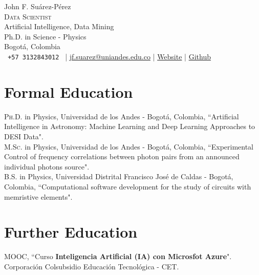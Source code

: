 \documentclass[10pt, a4paper]{article}
\newcommand{\years}[1]{\marginnote{\scriptsize #1}}
\begin{document}
{\LARGE John F. Suárez-Pérez}\\[0.5cm]
\textsc{Data Scientist}\\
Artificial Intelligence, Data Mining\\

Ph.D. in Science - Physics \\
Bogotá, Colombia\\[.2cm]
\texttt{ +57 3132843012 }
\hspace{0.3cm}|\hspace{0.3cm}
\href{mailto:jf.suarez@uniandes.edu.co}{jf.suarez@uniandes.edu.co}
\hspace{0.3cm}|\hspace{0.3cm}
\href{https://jsuarez314.gitlab.io}{Website}
\hspace{0.3cm}|\hspace{0.3cm}
\href{https://github.com/jsuarez314}{Github}



\section*{Formal Education}
\noindent
\years{2023}\textsc{Ph.D.} in Physics, Universidad de los Andes - Bogotá, Colombia, “Artificial Intelligence in Astronomy: Machine Learning and Deep Learning Approaches to DESI Data".\\

\years{2017}\textsc{M.Sc.} in Physics, Universidad de los Andes - Bogotá, Colombia, “Experimental 
Control of frequency correlations between photon pairs from an announced individual photons 
source".\\

\years{2014}\textsc{B.S.} in Physics, Universidad Distrital Francisco José de Caldas - 
Bogotá, Colombia, “Computational software development for the study of circuits with memristive 
elements".\\


\section*{Further Education}
\noindent
\years{2022}\textsc{MOOC}, “Curso\textbf{ Inteligencia Artificial (IA) con Microsfot Azure}". Corporación Colsubsidio Educación Tecnológica - CET.\\
\end{document}
